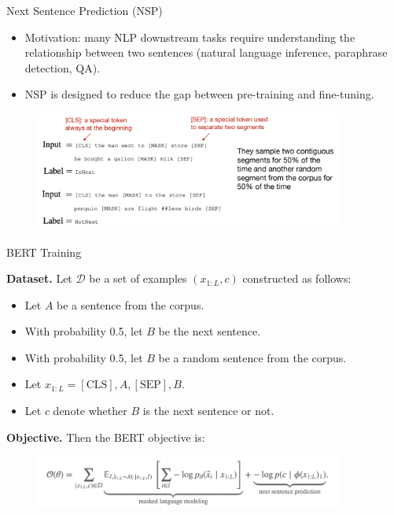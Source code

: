 \documentclass[serif, aspectratio=169]{beamer}
\begin{document}
\begin{frame}{Next Sentence Prediction (NSP)}
    \begin{itemize}
        \item Motivation: many NLP downstream tasks require understanding the relationship between two sentences (natural language inference, paraphrase detection, QA).
        \item NSP is designed to reduce the gap between pre-training and fine-tuning.
    \end{itemize}
    \begin{figure}
            \centering
            \includegraphics[width=0.9\textwidth]{Figures/NSP.png}
    \end{figure}
\end{frame}

\begin{frame}{BERT Training}

    \vspace{0.5cm}
    
    \textbf{Dataset.} Let $\mathcal{D}$ be a set of examples $(x_{1:L}, c)$ constructed as follows:
    
    \vspace{0.3cm}
    
    \begin{itemize}
        \item Let $A$ be a sentence from the corpus.
        \item With probability 0.5, let $B$ be the next sentence.
        \item With probability 0.5, let $B$ be a random sentence from the corpus.
        \item Let $x_{1:L} = [\text{CLS}], A, [\text{SEP}], B$.
        \item Let $c$ denote whether $B$ is the next sentence or not.
    \end{itemize}
    
    \textbf{Objective.} Then the BERT objective is:
    \begin{figure}
            \centering
            \includegraphics[width=0.9\textwidth]{Figures/Objective.png}
    \end{figure}

\end{frame}
\end{document}
